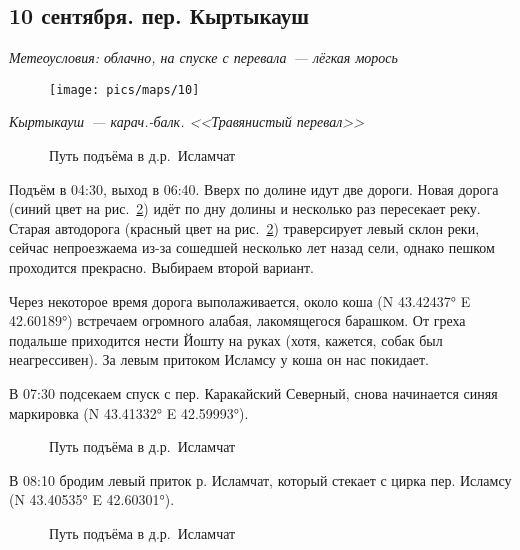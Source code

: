 \subsection{10 сентября. пер. Кыртыкауш}
\textit{Метеоусловия: облачно, на спуске с перевала~--- лёгкая морось}

\begin{figure}[h!]
	\centering
	\texttt{[image: pics/maps/10]}
	\label{fig:10}
\end{figure}

\textit{Кыртыкауш~--- карач.-балк. <<Травянистый перевал>>}

\begin{figure}[h!]
	\centering
	\caption{Путь подъёма в д.р.~Исламчат}
	\label{fig:routeToKyrtyk}
\end{figure}


Подъём в 04:30, выход в 06:40. Вверх по долине идут две дороги. Новая дорога (синий цвет на рис.~\ref{fig:routeToKyrtyk}) идёт по дну долины и несколько раз пересекает реку. Старая автодорога (красный цвет на рис.~\ref{fig:routeToKyrtyk}) траверсирует левый склон реки, сейчас непроезжаема из-за сошедшей несколько лет назад сели, однако пешком проходится прекрасно. Выбираем второй вариант. 

Через некоторое время дорога выполаживается, около коша (N 43.42437° E 42.60189°) встречаем огромного алабая, лакомящегося барашком. От греха подальше приходится нести Йошту на руках (хотя, кажется, собак был неагрессивен). За левым притоком Исламсу у коша он нас покидает.

В 07:30 подсекаем спуск с пер. Каракайский Северный, снова начинается синяя маркировка (N 43.41332° E 42.59993°).

\begin{figure}[h!]
	\centering
	\caption{Путь подъёма в д.р.~Исламчат}
	\label{fig:routeToKyrtyk2}
\end{figure}

В 08:10 бродим левый приток р. Исламчат, который стекает с цирка пер. Исламсу (N 43.40535° E 42.60301°).

\begin{figure}[h!]
	\centering
	\caption{Путь подъёма в д.р.~Исламчат}
	\label{fig:routeToKyrtyk3}
\end{figure}

